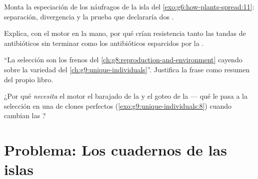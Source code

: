 \begin{exercise}[$\star\star$]\label{exo:g9:how-species-change:9}
Monta la especiación de los náufragos de la isla del
\cref{exo:g6:how-plants-spread:11}: separación, divergencia y la prueba
que declararía dos .
\end{exercise}

\begin{exercise}[$\star\star$]\label{exo:g9:how-species-change:10}
Explica, con el motor en la mano, por qué crían resistencia tanto las
tandas de antibióticos sin terminar como los antibióticos esparcidos
por la .
\end{exercise}

\begin{exercise}[$\star\star$]\label{exo:g9:how-species-change:11}
``La selección son los frenos del
\cref{ch:g8:reproduction-and-environment} cayendo sobre la variedad del
\cref{ch:g9:unique-individuals}''. Justifica la frase como resumen del
propio libro.
\end{exercise}

\begin{exercise}[$\star\star\star$]\label{exo:g9:how-species-change:12}
¿Por qué \emph{necesita} el motor el barajado de la 
y el goteo de la  --- qué le pasa a la selección en una
 de clones perfectos (\cref{exo:g9:unique-individuals:8})
cuando cambian las ?
\end{exercise}

\section{Problema: Los cuadernos de las islas}

